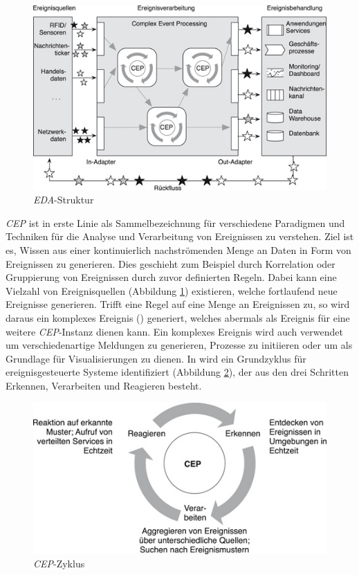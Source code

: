 \documentclass{acm_proc_article-sp}
\begin{document}
\begin{figure}[H]
    \centering
    \includegraphics[width=\linewidth]{img/eda-struktur-bruns.jpg}
    \caption{\textit{EDA}-Struktur}
    \label{img:eda-struktur}
\end{figure}

\textit{CEP} ist in erste Linie als Sammelbezeichnung für verschiedene Paradigmen und 
Techniken für die Analyse und Verarbeitung von Ereignissen zu verstehen. Ziel ist es, 
Wissen aus einer kontinuierlich nachströmenden Menge an Daten in Form von Ereignissen zu 
generieren. Dies geschieht zum Beispiel durch Korrelation oder Gruppierung von 
Ereignissen durch zuvor definierten Regeln. Dabei kann eine Vielzahl von 
Ereignisquellen (Abbildung \ref{img:eda-struktur}) existieren, welche fortlaufend neue 
Ereignisse generieren. Trifft eine Regel auf eine Menge an Ereignissen zu, so wird daraus 
ein komplexes Ereignis (\cite{glossary}) generiert, welches abermals als 
Ereignis für eine weitere 
\textit{CEP}-Instanz dienen kann. Ein komplexes Ereignis wird auch verwendet
um verschiedenartige Meldungen zu generieren, Prozesse zu initiieren oder um als 
Grundlage 
für Visualisierungen zu dienen. In \cite{bruns} wird ein Grundzyklus für 
ereignisgesteuerte Systeme identifiziert (Abbildung \ref{img:cep-zyklus}), der aus den 
drei Schritten Erkennen, Verarbeiten und Reagieren besteht.

\begin{figure}[H]
    \centering
    \includegraphics[width=\linewidth]{img/cep-zyklus-bruns.jpg}
    \caption{\textit{CEP}-Zyklus}
    \label{img:cep-zyklus}
\end{figure}
\end{document}
